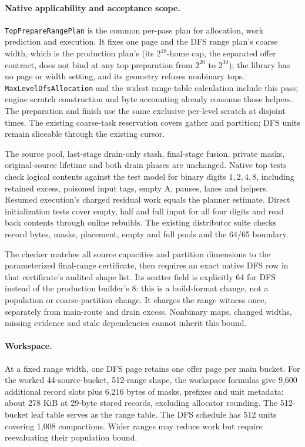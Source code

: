 \documentclass[11pt]{article}
\theoremstyle{definition}
\theoremstyle{remark}
\begin{document}
\paragraph{Native applicability and acceptance scope.}
\texttt{TopPrepareRangePlan} is the common per-pass plan for allocation,
work prediction and execution. It fixes one page and the DFS range plan's
coarse width, which is the production plan's (its $2^{18}$-home cap,
the separated offer contract, does not bind at any top preparation
from $2^{20}$ to $2^{30}$); the library has no page or width setting, and its geometry
refuses nonbinary tops. \texttt{MaxLevelDfsAllocation} and the widest range-table calculation
include this pass; engine scratch construction and byte accounting already
consume those helpers. The preparation and finish use the same exclusive
per-level scratch at disjoint times. The existing coarse-task reservation
covers gather and partition;
DFS units remain sliceable through the existing cursor.

The source pool, last-stage drain-only stash, final-stage fusion, private masks,
original-source lifetime and both drain phases are unchanged. Native top tests
check logical contents against the test model for binary digits
$1,2,4,8$, including retained excess, poisoned input tags, empty A, pauses,
lanes and helpers. Resumed execution's charged residual work equals the
planner estimate. Direct initialization tests cover empty, half and full
input for all four digits and read back contents through online rebuilds.
The existing distributor suite checks record bytes, masks, placement, empty
and full pools and the 64/65 boundary.

The checker matches all source capacities and partition dimensions to the
parameterized final-range certificate, then requires an exact native DFS row
in that certificate's audited shape list. Its scatter field is explicitly 64
for DFS instead of the production builder's 8: this is a build-format change,
not a population or coarse-partition change. It charges the range witness once,
separately from main-route and drain excess. Nonbinary maps, changed widths,
missing evidence and stale dependencies cannot inherit this bound.

\paragraph{Workspace.}
At a fixed range width, one DFS page retains one offer page per main
bucket. For the worked 44-source-bucket, 512-range shape, the
workspace formulas give 9,600 additional record slots plus 6,216 bytes
of masks, prefixes and unit metadata: about 278 KiB at 29-byte stored
records, excluding allocator rounding. The 512-bucket leaf table serves as
the range table. The DFS schedule has 512 units covering 1,008
compactions. Wider ranges may reduce work but require reevaluating their
population bound.
\end{document}
